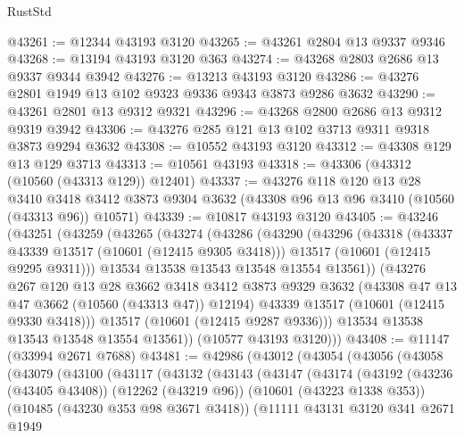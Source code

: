 \begin{lexlean}{RustStd}
\begin{coremodule}
@43261 := @12344 @43193 @3120
@43265 := @43261 @2804 @13 @9337 @9346
@43268 := @13194 @43193 @3120 @363
@43274 := @43268 @2803 @2686 @13 @9337 @9344 @3942
@43276 := @13213 @43193 @3120
@43286 := @43276 @2801 @1949 @13 @102 @9323 @9336 @9343 @3873 @9286 @3632
@43290 := @43261 @2801 @13 @9312 @9321
@43296 := @43268 @2800 @2686 @13 @9312 @9319 @3942
@43306 := @43276 @285 @121 @13 @102 @3713 @9311 @9318 @3873 @9294 @3632
@43308 := @10552 @43193 @3120
@43312 := @43308 @129 @13 @129 @3713
@43313 := @10561 @43193
@43318 := @43306 (@43312 (@10560 (@43313 @129)) @12401)
@43337 := @43276
    @118
    @120
    @13
    @28
    @3410
    @3418
    @3412
    @3873
    @9304
    @3632
    (@43308 @96 @13 @96 @3410 (@10560 (@43313 @96)) @10571)
@43339 := @10817 @43193 @3120
@43405 := @43246
    (@43251
      (@43259
        (@43265
          (@43274
            (@43286
              (@43290
                (@43296
                  (@43318
                    (@43337 @43339 @13517 (@10601 (@12415 @9305 @3418)))
                    @13517
                    (@10601 (@12415 @9295 @9311)))
                  @13534
                  @13538
                  @13543
                  @13548
                  @13554
                  @13561))
              (@43276
                @267
                @120
                @13
                @28
                @3662
                @3418
                @3412
                @3873
                @9329
                @3632
                (@43308 @47 @13 @47 @3662 (@10560 (@43313 @47)) @12194)
                @43339
                @13517
                (@10601 (@12415 @9330 @3418)))
              @13517
              (@10601 (@12415 @9287 @9336)))
            @13534
            @13538
            @13543
            @13548
            @13554
            @13561))
        (@10577 @43193 @3120)))
@43408 := @11147 (@33994 @2671 @7688)
@43481 := @42986
    (@43012
      (@43054
        (@43056
          (@43058
            (@43079
              (@43100
                (@43117
                  (@43132
                    (@43143
                      (@43147
                        (@43174
                          (@43192
                            (@43236 (@43405 @43408))
                            (@12262 (@43219 @96))
                            (@10601 (@43223 @1338 @353))
                            (@10485 (@43230 @353 @98 @3671 @3418))
                            (@11111
                              @43131
                              @3120
                              @341
                              @2671
                              @1949

\end{coremodule}
\end{lexlean}
